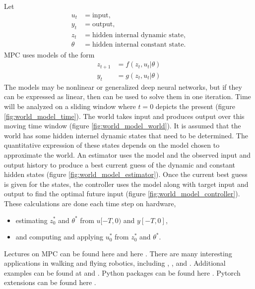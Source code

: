 \documentclass{article}
\begin{document}
    Let
    \begin{align*}
        u_t&=\text{input},\\
        y_t&=\text{output},\\
        z_t&=\text{hidden internal dynamic state},\\
        \theta_{\phantom{t}}&=\text{hidden internal constant state}.
    \end{align*}
    MPC uses models of the form 
    \begin{align*}
        z_{t+1}&=f(z_t,u_t|\theta)\\
        y_t &= g(z_t,u_t|\theta)
    \end{align*}
    The models may be nonlinear or generalized deep neural networks, but if they can
    be expressed as linear, then \QP can be used to solve them in one iteration.
    Time will be analyzed on a sliding window where $t=0$ depicts the present 
    (figure \ref{fig:world_model_time}).
    The world takes input and produces output over this moving time window
    (figure \ref{fig:world_model_world}).
    It is assumed that the world has some hidden internel dynamic states
    that need to be determined.  
    The quantitative expression of these states depends on the model
    chosen to approximate the world.  An estimator uses the model and the observed
    input and output history to produce a best current guess of the dynamic and constant
    hidden states (figure \ref{fig:world_model_estimator}).
    Once the current best guess is given for the states,
    the controller uses the model along with target
    input and output to find the optimal future input
    (figure \ref{fig:world_model_controller}).
    These calculations are done each time step on hardware, 
    \begin{itemize}
        \item estimating $z_0^*$ and $\theta^*$ from $u[-T,0)$ and $y[-T,0]$,
        \item and computing and applying $u_0^*$ from $z_0^*$ and $\theta^*$.
    \end{itemize}

    Lectures on MPC can be found here \cite{mpc} and here \cite{bv_mpc}. 
    There are many interesting applications in walking and flying robotics,
    including \cite{mit}, \cite{eth}, and \cite{dandrea}.  
    Additional examples can be found at \cite{tedrake} and \cite{abbeel}.
    Python packages can be found here \cite{osqp}.
    Pytorch extensions can be found here \cite{mpc_pytorch}.
\end{document}

